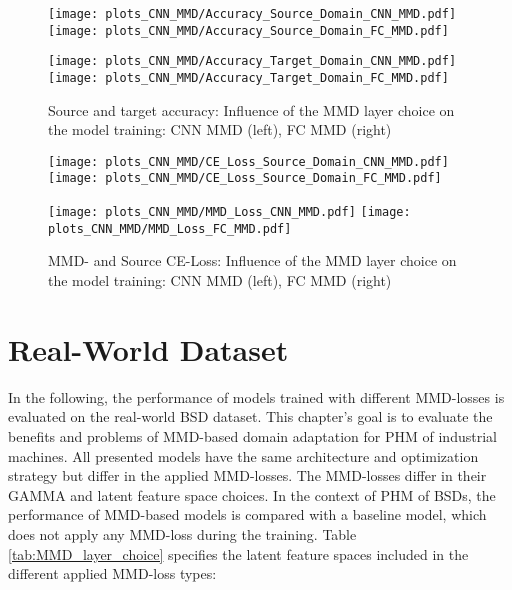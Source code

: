 \begin{figure}[htp]
  \centering
  \texttt{[image: plots\_CNN\_MMD/Accuracy\_Source\_Domain\_CNN\_MMD.pdf]}
  \hspace{.3cm}
  \texttt{[image: plots\_CNN\_MMD/Accuracy\_Source\_Domain\_FC\_MMD.pdf]}

  \vspace{.1cm}

  \texttt{[image: plots\_CNN\_MMD/Accuracy\_Target\_Domain\_CNN\_MMD.pdf]}
  \hspace{.3cm}
  \texttt{[image: plots\_CNN\_MMD/Accuracy\_Target\_Domain\_FC\_MMD.pdf]}

  \caption{Source and target accuracy: Influence of the MMD layer choice on the model training: CNN MMD (left), FC MMD (right)}
  \label{fig:accuracy_cnn_and_no_cnn_mmd}
\end{figure}

\begin{figure}[H]
  \centering
  \texttt{[image: plots\_CNN\_MMD/CE\_Loss\_Source\_Domain\_CNN\_MMD.pdf]}
  \hspace{.3cm}
  \texttt{[image: plots\_CNN\_MMD/CE\_Loss\_Source\_Domain\_FC\_MMD.pdf]}

  \vspace{.1cm}

  \texttt{[image: plots\_CNN\_MMD/MMD\_Loss\_CNN\_MMD.pdf]}
  \hspace{.1cm}
  \texttt{[image: plots\_CNN\_MMD/MMD\_Loss\_FC\_MMD.pdf]}

  \caption{MMD- and Source CE-Loss: Influence of the MMD layer choice on the model training: CNN MMD (left), FC MMD (right)}
  \label{fig:loss_cnn_and_no_cnn_mmd}
\end{figure}

\section{Real-World Dataset}\label{sec:results_real_world_dataset}
In the following, the performance of models trained with different MMD-losses is evaluated on the real-world BSD dataset. This chapter's goal is to evaluate the benefits and problems of MMD-based domain adaptation for PHM of industrial machines. All presented models have the same architecture and optimization strategy but differ in the applied MMD-losses. The MMD-losses differ in their GAMMA and latent feature space choices. In the context of PHM of BSDs, the performance of MMD-based models is compared with a baseline model, which does not apply any MMD-loss during the training. Table \ref{tab:MMD_layer_choice}  specifies the latent feature spaces included in the different applied MMD-loss types:

